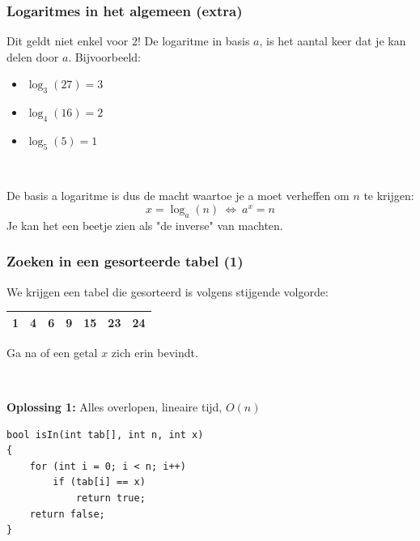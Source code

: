\documentclass[12pt]{beamer}
\begin{document}
\begin{frame}
\frametitle{Logaritmes in het algemeen (extra)}
Dit geldt niet enkel voor 2! De logaritme in basis $a$, is het aantal keer dat je kan delen door $a$. Bijvoorbeeld:
\begin{itemize}
\item $\log_3(27) = 3$
\item $\log_4(16) = 2$
\item $\log_5(5) = 1$
\end{itemize}

~

De basis a logaritme is dus de macht waartoe je a moet verheffen om $n$ te krijgen:
\[ x = \log_a (n)\ \Leftrightarrow\ a^x = n \]
Je kan het een beetje zien als "de inverse" van machten.
\end{frame}

\begin{frame}[fragile]
\frametitle{Zoeken in een gesorteerde tabel (1)}
We krijgen een tabel die gesorteerd is volgens stijgende volgorde:
\begin{center}
\def\arraystretch{1.3}
\begin{tabu} to .7\textwidth {|X[c]|X[c]|X[c]|X[c]|X[c]|X[c]|X[c]|}
 & 4 & 6 & 9 & 15 & 23 & 24 \\
\hline
\end{tabu}
\end{center}
Ga na of een getal $x$ zich erin bevindt.

~

\textbf{Oplossing 1:} Alles overlopen, lineaire tijd, $O(n)$
\begin{lstlisting}
bool isIn(int tab[], int n, int x)
{
    for (int i = 0; i < n; i++)
        if (tab[i] == x)
            return true;
    return false;
}
\end{lstlisting}
\end{frame}
\end{document}
